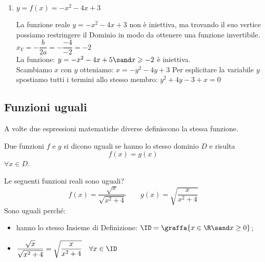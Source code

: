 \begin{esempio}
\begin{enumerate}
\pagebreak %

\item \(y = f(x) = -x^2-4x+3\)

La funzione reale
\(y=-x^2-4x+3\) non è iniettiva, ma trovando il suo vertice possiamo 
restringere il Dominio in modo da ottenere una funzione invertibile. \\[.5em]
\( x_V = -\dfrac{b}{2a} = -\dfrac{-4}{-2} = -2\) \\[.5em]
La funzione:  \quad 
\(y=-x^2-4x+5 \sand x \geqslant -2\) \quad
è iniettiva. \\[.5em]
Scambiamo \(x\) con \(y\) otteniamo: \quad 
\(x = -y^2-4y+3\) 
Per esplicitare la variabile \(y\) spostiamo tutti i termini allo stesso 
membro:
\(y^2+4y-3 +x = 0\)


\end{enumerate}
\end{esempio}

\subsection{Funzioni uguali}

A volte due espressioni matematiche diverse definiscono la stessa funzione.

\begin{definizione}
Due funzioni \(f\) e \(g\) si dicono uguali se hanno lo stesso dominio \(D\) 
e risulta \[f(x)=g(x)\] \(\forall x\in D\).\\
\end{definizione}

\begin{esempio}
Le seguenti funzioni reali sono uguali?
\[f(x)=\frac{\sqrt{x}}{\sqrt{x^2+4}} \qquad g(x)=\sqrt{\frac{x}{x^2+4}}\]
Sono uguali perché:
\begin{itemize}[nosep]
\item hanno lo stesso Insieme di Definizione: 
\(\ID =\graffa{x \in \R \sand x \geq 0}\);
\item 
\(\dfrac{\sqrt{x}}{\sqrt{x^2+4}} = \sqrt{\dfrac{x}{x^2+4}} \quad 
  \forall x \in \ID\)
\end{itemize}
\end{esempio}

